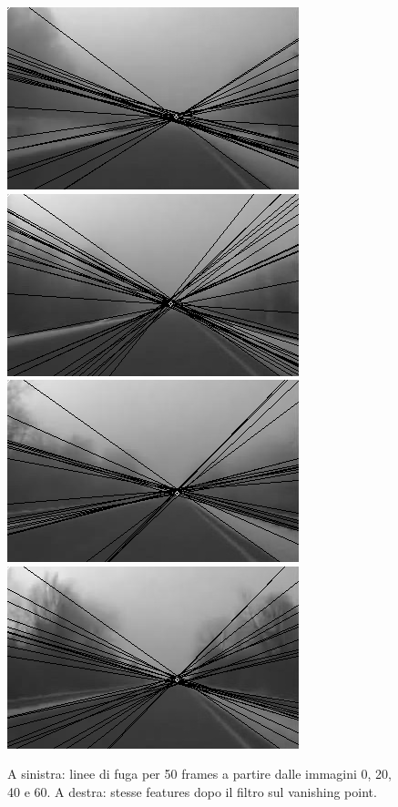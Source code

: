 \documentclass[12pt]{report}
\begin{document}
\begin{figure}[H]
\begin{minipage}[c]{0.5\linewidth}
	\centering
	\includegraphics[scale=\imTrackScale]{images/aF_0000_50.png}
	\includegraphics[scale=\imTrackScale]{images/aF_0020_50.png}
	\includegraphics[scale=\imTrackScale]{images/aF_0040_50.png}
	\includegraphics[scale=\imTrackScale]{images/aF_0060_50.png}
\end{minipage}
\caption[short]{A sinistra: linee di fuga per 50 frames a partire dalle immagini 0, 20, 40 e 60. A destra: stesse features dopo il filtro sul vanishing point.}
\label{fig:vp50}
\end{figure}
\end{document}
